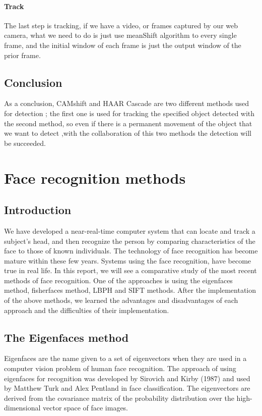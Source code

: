 \documentclass[a4paper,12pt]{report}
\begin{document}
    \subsubsection{Track}

    The last step is tracking, if we have a video, or frames captured by our web camera, what we need to do is just use meanShift algorithm to every single frame, and the initial window of each frame is just the output window of the prior frame.
 
  
    \section{Conclusion}
    As a conclusion, CAMshift and HAAR Cascade are two different methods used for detection ; the first one is used for tracking the specified object detected with the second method, so even if there is a permanent movement of the object that we want to detect ,with the collaboration of this two methods the detection will be succeeded.
    
 
    
\chapter{Face recognition methods}  
	\section{Introduction}
	We have developed a near-real-time computer system that can locate and track a subject's head, and then recognize the person by comparing characteristics of the face to those of known individuals. The technology of face recognition has become mature within these few years. Systems using the face recognition, have become true in real life. In this report, we will see a comparative study of the most recent methods of face recognition. One of the approaches is using the eigenfaces method, fisherfaces method, LBPH and SIFT methods. After the implementation of the above methods, we learned the advantages and disadvantages of each approach and the difficulties of their implementation.
	
	\section{The Eigenfaces method}
		Eigenfaces are the name given to a set of eigenvectors when they are used in a computer vision problem of human face recognition. The approach of using eigenfaces for recognition was developed by Sirovich and Kirby (1987) and used by Matthew Turk and Alex Pentland in face classification. The eigenvectors are derived from the covariance matrix of the probability distribution over the high-dimensional vector space of face images.
		  
\end{document}
